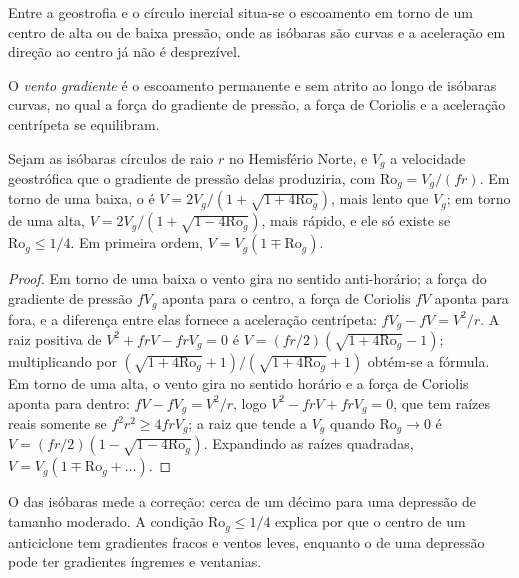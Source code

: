 Entre a geostrofia e o círculo inercial situa-se o escoamento em torno de um centro de
alta ou de baixa pressão, onde as isóbaras são curvas e a aceleração
em direção ao centro já não é desprezível.

\begin{definition}\label{def:b3:gfd-foundations:gradient}
O \emph{vento gradiente} é o escoamento permanente e sem atrito
ao longo de isóbaras curvas, no qual a força do gradiente de pressão, a
força de Coriolis e a aceleração centrípeta se equilibram.
\end{definition}

\begin{proposition}\label{prop:b3:gfd-foundations:gradient}
Sejam as isóbaras círculos de raio $r$ no Hemisfério Norte, e
$V_g$ a velocidade geostrófica que o gradiente de pressão delas produziria, com
$\mathrm{Ro}_g = V_g/(fr)$. Em torno de uma baixa, o  é
$V = 2V_g/(1 + \sqrt{1 + 4\mathrm{Ro}_g})$, mais lento que $V_g$; em torno de uma
alta, $V = 2V_g/(1 + \sqrt{1 - 4\mathrm{Ro}_g})$, mais rápido, e ele só existe
se $\mathrm{Ro}_g \le 1/4$. Em primeira ordem, $V = V_g(1 \mp \mathrm{Ro}_g)$.
\end{proposition}

\begin{proof}
Em torno de uma baixa o vento gira no sentido anti-horário; a força do gradiente de pressão
$fV_g$ aponta para o centro, a força de Coriolis $fV$ aponta para fora, e a
diferença entre elas fornece a aceleração centrípeta: $fV_g - fV = V^2/r$. A
raiz positiva de $V^2 + frV - frV_g = 0$ é $V = (fr/2)(\sqrt{1 +
4\mathrm{Ro}_g} - 1)$; multiplicando por $(\sqrt{1 + 4\mathrm{Ro}_g} +
1)/(\sqrt{1 + 4\mathrm{Ro}_g} + 1)$ obtém-se a fórmula. Em torno de uma alta, o
vento gira no sentido horário e a força de Coriolis aponta para dentro: $fV - fV_g =
V^2/r$, logo $V^2 - frV + frV_g = 0$, que tem raízes reais somente se $f^2r^2
\ge 4frV_g$; a raiz que tende a $V_g$ quando $\mathrm{Ro}_g \to 0$ é
$V = (fr/2)(1 - \sqrt{1 - 4\mathrm{Ro}_g})$. Expandindo as raízes quadradas,
$V = V_g(1 \mp \mathrm{Ro}_g + \dots)$.
\end{proof}

O  das isóbaras mede a correção: cerca de um décimo para uma
depressão de tamanho moderado. A condição $\mathrm{Ro}_g \le 1/4$ explica por que
o centro de um anticiclone tem gradientes fracos e ventos leves, enquanto o de
uma depressão pode ter gradientes íngremes e ventanias.

